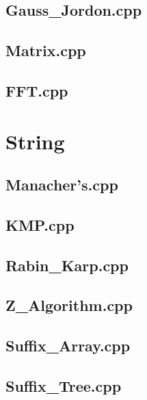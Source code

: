 \subsection{Gauss\_Jordon.cpp}

\subsection{Matrix.cpp}

\subsection{FFT.cpp}

\section{String}
\subsection{Manacher's.cpp}

\subsection{KMP.cpp}

\subsection{Rabin\_Karp.cpp}

\subsection{Z\_Algorithm.cpp}

\subsection{Suffix\_Array.cpp}

\subsection{Suffix\_Tree.cpp}

